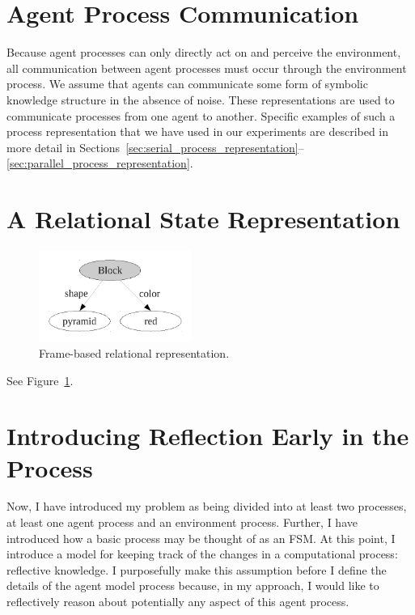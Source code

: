\section{Agent Process Communication}

Because agent processes can only directly act on and perceive the
environment, all communication between agent processes must occur
through the environment process.  We assume that agents can
communicate some form of symbolic knowledge structure in the absence
of noise.  These representations are used to communicate processes
from one agent to another.  Specific examples of such a process
representation that we have used in our experiments are described in
more detail in
Sections~\ref{sec:serial_process_representation}--\ref{sec:parallel_process_representation}.


\section{A Relational State Representation}

\begin{figure}[bth]
  \center
  \includegraphics[height=3cm]{gfx/frame_representation}
  \caption[Frame-based relational representation]{Frame-based relational representation.}
  \label{fig:frame_representation}
\end{figure}

See Figure~\ref{fig:frame_representation}.

\section{Introducing Reflection Early in the Process}

Now, I have introduced my problem as being divided into at least two
processes, at least one agent process and an environment process.
Further, I have introduced how a basic process may be thought of as an
\ac{FSM}.  At this point, I introduce a model for keeping track of the
changes in a computational process: reflective knowledge.  I
purposefully make this assumption before I define the details of the
agent model process because, in my approach, I would like to
reflectively reason about potentially any aspect of this agent
process.

